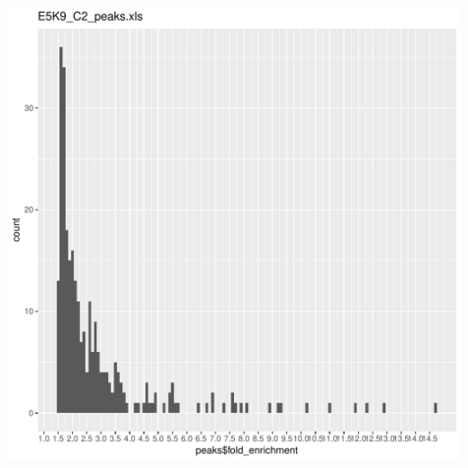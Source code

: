 \documentclass{article}\usepackage[]{graphicx}\usepackage[]{color}
\makeatletter
\def\maxwidth{ %
  \ifdim\Gin@nat@width>\linewidth
    \linewidth
  \else
    \Gin@nat@width
  \fi
}
\newenvironment{knitrout}{}{} %
\makeatother
\begin{document}
\begin{knitrout}
\includegraphics[width=\maxwidth]{figure/unnamed-chunk-2-22} 

\end{knitrout}
\end{document}

